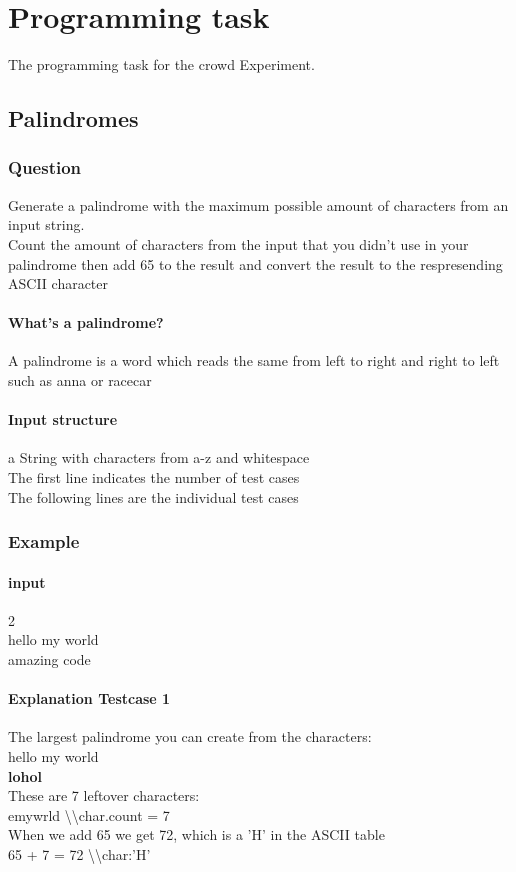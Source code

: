 \chapter{Programming task}

The programming task for the crowd Experiment.


\section{Palindromes}

\subsection{Question}
Generate a palindrome with the maximum possible amount of characters from an input string.\\
Count the amount of characters from the input that you didn't use in your palindrome then add 65 to the result and convert the result to the respresending ASCII character

\subsubsection{What's a palindrome?}
A palindrome is a word which reads the same from left to right and right to left such as anna or racecar

\subsubsection{Input structure}
a String with characters from a-z and whitespace\\
The first line indicates the number of test cases\\
The following lines are the individual test cases\\

\subsection{Example}
\subsubsection{input}
2\\
hello my world\\
amazing code\\

\subsubsection{Explanation Testcase 1}
The largest palindrome you can create from the characters:\\
hello my world\\
\quad \textbf{lohol}\\
These are 7 leftover characters:\\
\quad emywrld \quad\quad\quad\quad\quad\quad\quad\quad\textbackslash\textbackslash char.count = 7\\
When we add 65 we get 72, which is a 'H' in the ASCII table\\
65 + 7 = 72 \quad\quad\quad\quad\quad\quad\textbackslash\textbackslash char:'H'\\

